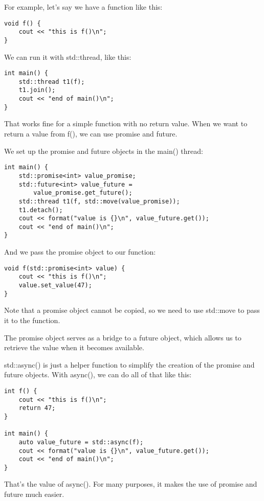 For example, let's say we have a function like this:

\begin{lstlisting}[style=styleCXX]
void f() {
	cout << "this is f()\n";
}
\end{lstlisting}

We can run it with std::thread, like this:

\begin{lstlisting}[style=styleCXX]
int main() {
	std::thread t1(f);
	t1.join();
	cout << "end of main()\n";
}
\end{lstlisting}

That works fine for a simple function with no return value. When we want to return a value from f(), we can use promise and future.

We set up the promise and future objects in the main() thread:

\begin{lstlisting}[style=styleCXX]
int main() {
	std::promise<int> value_promise;
	std::future<int> value_future =
		value_promise.get_future();
	std::thread t1(f, std::move(value_promise));
	t1.detach();
	cout << format("value is {}\n", value_future.get());
	cout << "end of main()\n";
}
\end{lstlisting}

And we pass the promise object to our function:

\begin{lstlisting}[style=styleCXX]
void f(std::promise<int> value) {
	cout << "this is f()\n";
	value.set_value(47);
}
\end{lstlisting}

Note that a promise object cannot be copied, so we need to use std::move to pass it to the function.

The promise object serves as a bridge to a future object, which allows us to retrieve the value when it becomes available.

std::async() is just a helper function to simplify the creation of the promise and future objects. With async(), we can do all of that like this:

\begin{lstlisting}[style=styleCXX]
int f() {
	cout << "this is f()\n";
	return 47;
}

int main() {
	auto value_future = std::async(f);
	cout << format("value is {}\n", value_future.get());
	cout << "end of main()\n";
}
\end{lstlisting}

That's the value of async(). For many purposes, it makes the use of promise and future much easier.

















